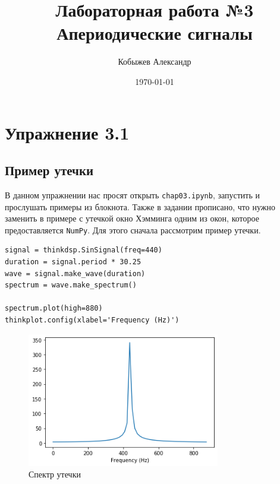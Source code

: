 \documentclass[a4paper,12pt]{report}
\title{Лабораторная работа №3\\Апериодические сигналы}
\author{Кобыжев Александр}
\date{\today}
\begin{document}
\maketitle
\tableofcontents
\listoffigures
\lstlistoflistings

\maketitle

\chapter{Упражнение 3.1}
\section{Пример утечки}

В данном упражнении нас просят открыть \texttt{chap03.ipynb}, запустить и прослушать примеры из блокнота. Также в задании прописано, что нужно заменить в примере с утечкой окно Хэмминга одним из окон, которое предоставляется \texttt{NumPy}. Для этого сначала рассмотрим пример утечки.

\begin{lstlisting}[caption=Пример утечки]
signal = thinkdsp.SinSignal(freq=440)
duration = signal.period * 30.25
wave = signal.make_wave(duration)
spectrum = wave.make_spectrum()

spectrum.plot(high=880)
thinkplot.config(xlabel='Frequency (Hz)')
\end{lstlisting}

\begin{figure}[H]
        \centering
        \includegraphics[width=0.75\textwidth]{lab3_fig1_1.png}
        \caption{Спектр утечки}
        \label{fig:lab3_fig1_1}
\end{figure}
\end{document}
